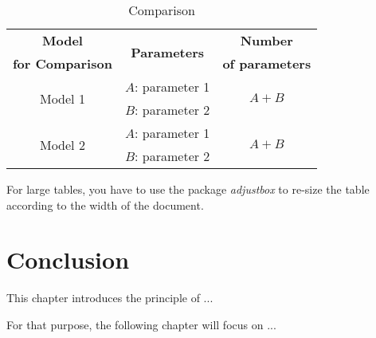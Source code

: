 \newpage

\begin{table}[!h]
	\centering
	\caption{Comparison}
	\begin{tabular}{|c|c|c|}
		\hline
		\textbf{Model } & \multirow{2}{*}{\textbf{Parameters}} & \textbf{Number} \\
		\textbf{for Comparison} &  & \textbf{of parameters} \\
		\hline
		\hline
		\multirow{2}{*}{Model 1} & $A$: parameter 1 & \multirow{2}{*}{$ A+B $}\\
		& $B$: parameter 2 & \\
		\hline
		\multirow{2}{*}{Model 2} & $A$: parameter 1 & \multirow{2}{*}{$A+B$}\\
		& $B$: parameter 2 & \\
		\hline
	\end{tabular}
	\label{TabTest1}
\end{table}

For large tables, you have to use the package \textit{adjustbox} to re-size the table according to the width of the document.	

\section{Conclusion}

This chapter introduces the principle of ...

For that purpose, the following chapter will focus on ...